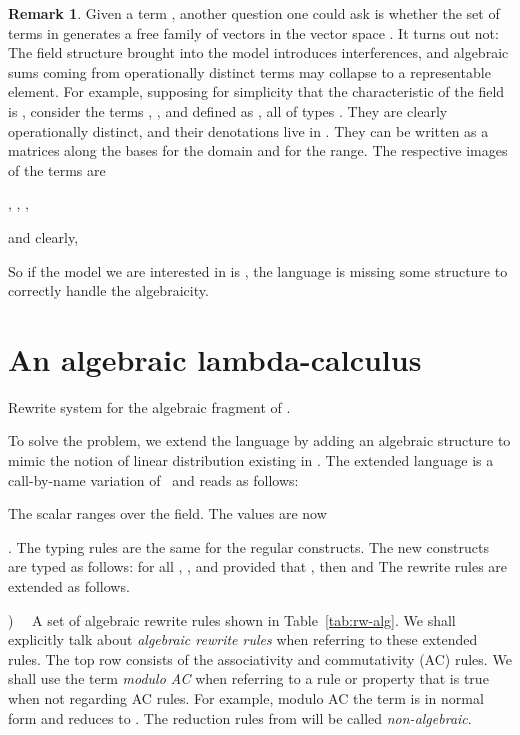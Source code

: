 \documentclass[10pt]{article}
\theoremstyle{plain}
\theoremstyle{definition}
\newtheorem{remark}[theorem]{Remark}
\begin{document}
\begin{remark}
Given a term , another question one could ask is whether the set of
terms  in  generates a free family of vectors in the
vector space . It turns
out not: The field structure brought into the model introduces
interferences, and algebraic sums coming from operationally distinct
terms may collapse to a representable element. For example, supposing
for simplicity that the characteristic of the field is , consider
the terms , ,
 and  defined as ,
all of types . They are clearly operationally distinct,
and their denotations live in . They can be
written as a  matrices along the bases
 for the domain and
 for the range. The respective images of the 
terms are

,
,
,

and clearly,


So if the model we are interested in is , the language is
missing some structure to correctly handle the algebraicity.
\end{remark}


\section{An algebraic lambda-calculus}
\label{sec:alglc}

\begin{table}[t]
    \caption{Rewrite system for the algebraic fragment of
      .}
    \label{tab:rw-alg}
\scalebox{.83}{\begin{minipage}{5.7in}
\end{minipage}}
\end{table}


To solve the problem, we extend the language  by adding an
algebraic structure to mimic the notion of linear distribution
existing in . The extended language 
is a call-by-name variation of~\cite{ad08,adv11} and reads as follows:

The scalar  ranges over the field.
The values are now

.
The typing rules are the same for the regular constructs. The new
constructs are typed as follows: for all , , 
and provided that ,
then  and 
The rewrite rules are extended as follows.

\smallskip
{})~~ A set of algebraic rewrite rules shown in
Table~\ref{tab:rw-alg}. We shall explicitly talk about {\em algebraic
  rewrite rules} when referring to these extended rules. The top row
consists of the associativity and commutativity (AC) rules. We shall
use the term {\em modulo AC} when referring to a rule or property that
is true when not regarding AC rules. For example, modulo AC the term  is
in normal form and 
reduces to .
The reduction
rules from  will be called {\em non-algebraic}.
\end{document}
